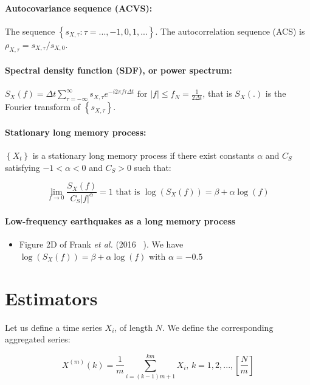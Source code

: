 \documentclass[methods.tex]{subfiles}
\begin{document}
\paragraph{Autocovariance sequence (ACVS):} The sequence $\left\{ s_{X , \tau} : \tau = ... , -1 , 0 , 1 , ... \right\}$. The autocorrelation sequence (ACS) is $\rho_{X , \tau} = s_{X , \tau } / s_{X , 0}$.

\paragraph{Spectral density function (SDF), or power spectrum:} $S_X \left( f \right) = \Delta t \sum_{\tau = - \infty}^{\infty} s_{X , \tau} e^{- i 2 \pi f \tau \Delta t} \text{ for } \left| f \right| \leq f_N = \frac{1}{2 \Delta t}$, that is $S_X \left( . \right)$ is the Fourier transform of $\left\{ s_{X , \tau} \right\}$.

\paragraph{Stationary long memory process:} $\left\{ X_t \right\}$ is a stationary long memory process if there exist constants $\alpha$ and $C_S$ satisfying $ -1 < \alpha < 0$ and $C_S > 0$ such that:

\begin{equation}
\lim_{f \to 0} \frac{S_X \left( f \right)}{C_S \left| f \right| ^{\alpha}} = 1 \text{ that is } \log \left( S_X \left( f \right) \right) = \beta + \alpha \log \left( f \right)
\end{equation}

\paragraph{Low-frequency earthquakes as a long memory process}

\begin{itemize}
\item Figure 2D of Frank \textit{et al.} (2016 ~\cite{FRA_2016}). We have $\log \left( S_X \left( f \right) \right) = \beta + \alpha \log \left( f \right)$ with $\alpha = - 0.5$
\end{itemize}

\section{Estimators}

Let us define a time series $X_i$, of length $N$. We define the corresponding aggregated series:

\begin{equation}
X^{\left( m \right)} \left( k \right) = \frac{1}{m} \sum_{i = \left( k - 1 \right) m + 1}^{k m} X_i \text{, } k = 1 , 2 , ... , \left[ \frac{N}{m} \right]
\end{equation}
\end{document}
